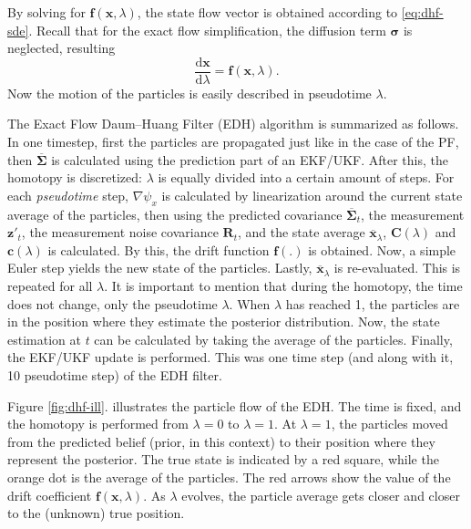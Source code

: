 By solving for $\mathbf{f}(\mathbf{x},\lambda)$,
the state flow vector is obtained according to \eqref{eq:dhf-sde}.
Recall that for the exact flow simplification, the diffusion term $\boldsymbol\sigma$ is
neglected, resulting
\begin{equation}
  \frac{\mathrm{d}\mathbf{x}}{\mathrm{d}\lambda} = \mathbf{f}(\mathbf{x},\lambda).
\end{equation}
Now the motion of the particles is easily described in pseudotime $\lambda$.

The Exact Flow Daum--Huang Filter (EDH) algorithm is summarized as follows.
In one timestep, first the particles are propagated just like in the case of the PF, then $\overline{\mathbf{\Sigma}}$ is calculated using the prediction part of an EKF/UKF.  After this, the homotopy is discretized: $\lambda$ is equally divided into a certain amount of steps. For each \emph{pseudotime} step, $\nabla \psi_x$ is calculated  by linearization around the current state average of the particles, then using the predicted covariance $\overline{\mathbf{\Sigma}}_t$, the measurement $\mathbf{z}'_t$, the measurement noise covariance $\mathbf{R}_t$, and the state average $\overline{\mathbf{x}}_\lambda$, $\mathbf{C}(\lambda)$ and $\mathbf{c}(\lambda)$ is calculated. By this, the drift function $\mathbf{f}(.)$ is obtained. Now, a simple Euler step yields the new state of the particles. Lastly, $\overline{\mathbf{x}}_\lambda$ is re-evaluated. This is repeated for all $\lambda$. It is important to mention that during the homotopy, the time does not change, only the pseudotime $\lambda$. When $\lambda$ has reached 1, the particles are in the position where they estimate the posterior distribution. Now, the state estimation at $t$ can be calculated by taking the average of the particles. Finally, the EKF/UKF update is performed. This was one time step (and along with it, 10 pseudotime step) of the EDH filter.

Figure \ref{fig:dhf-ill}. illustrates the particle flow of the EDH. The time is fixed, and the homotopy is performed from $\lambda = 0$ to $\lambda = 1$. At $\lambda = 1$, the particles moved from the predicted belief (prior, in this context) to their position where they represent the posterior. The true state is indicated by a red square, while the orange dot is the average of the particles. The red arrows show the value of the drift coefficient $\mathbf{f}(\mathbf{x},\lambda)$. As $\lambda$ evolves, the particle average gets closer and closer to the (unknown) true position.

